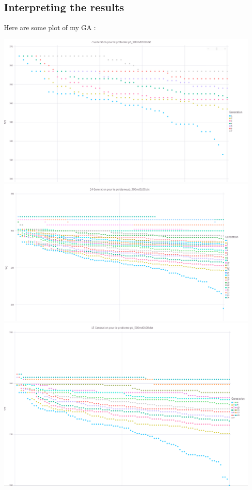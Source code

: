 \documentclass[12pt]{article}
\begin{document}
	\subsection{Interpreting the results}
	Here are some plot of my GA :
	\begin{center}
		\includegraphics[scale=0.5]{100rnd0100.png}
		\includegraphics[scale=0.5]{500rnd0101.png}
		\includegraphics[scale=0.5]{500rnd0102.png}

\end{center}
\end{document}
